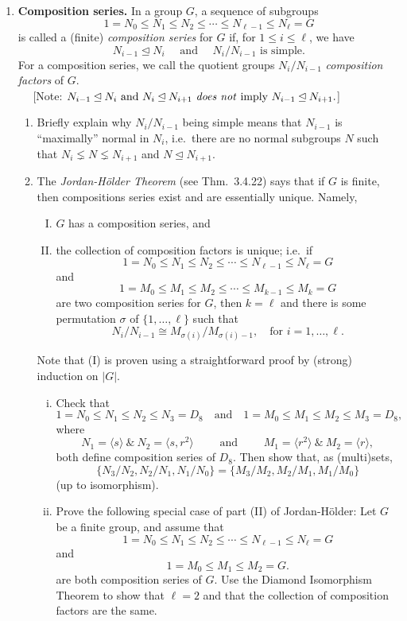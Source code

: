 \documentclass[11pt, reqno]{amsart}
\theoremstyle{plain}
\theoremstyle{definition}
\theoremstyle{example}
\def\<{\langle} \def\>{\rangle}
\def\normeq{\unlhd}
\begin{document}
\begin{enumerate}[1.]
\item {\bf Composition series.} In a group $G$, a sequence of subgroups 
$$1 = N_0 \leq N_1 \leq N_2 \leq \cdots \leq N_{\ell-1} \leq N_\ell = G$$
is called a (finite) \emph{composition series} for $G$ if, for $1 \leq i \leq \ell$, we have
$$N_{i-1} \normeq N_{i} \quad \text{ and } \quad N_{i}/N_{i-1} \text{ is simple.}$$
 For a composition series, we call the quotient groups $N_{i}/N_{i-1}$  \emph{composition factors} of $G$.\\$\quad$ \hfill{\footnotesize[Note:  
$N_{i-1} \normeq N_{i} \text{ and } N_i \normeq N_{i+1} \text{ \emph{does not} imply } N_{i-1} \normeq N_{i+1}.$]}
\begin{enumerate}
\item Briefly explain why $N_{i}/N_{i-1}$ being simple means that $N_{i-1}$ is ``maximally'' normal in $N_{i}$, i.e.\  there are no normal subgroups $N$ such that $N_{i} \lneq N \lneq N_{i+1}$ and $N \normeq N_{i+1}$. 
\item The \emph{Jordan-H\"{o}lder Theorem} (see Thm.\ 3.4.22) says that if $G$ is finite, then compositions series exist and are essentially unique. Namely,
\begin{enumerate}[(I)]
\item $G$ has a composition series, and 
\item the collection of composition factors is unique; i.e.\ if 
$$1 = N_0 \leq N_1 \leq N_2 \leq \cdots \leq N_{\ell-1} \leq N_\ell = G$$
and 
$$1 = M_0 \leq M_1 \leq M_2 \leq \cdots \leq M_{k-1} \leq M_k = G$$
are two composition series for $G$, then $k = \ell$ and there is some permutation $\sigma$ of $\{1, \dots, \ell\}$ such that 
$$N_i/ N_{i-1} \cong M_{\sigma(i)}/ M_{\sigma(i) - 1}, \quad \text{for } i = 1, \dots, \ell.$$
\end{enumerate}
Note that (I) is proven using a straightforward proof by (strong) induction on $|G|$. 
\begin{enumerate}[(i)]
\item Check that
$$1 = N_0 \leq N_1 \leq N_2 \leq N_3 = D_8 \quad \text{and} \quad 
	1 = M_0 \leq M_1 \leq M_2 \leq M_3 = D_8,$$
where 
$$N_1 = \<s\> \ \&\ N_2 = \<s, r^2\> \qquad \text{ and } \qquad M_1 = \<r^2\>  \ \&\ M_2 = \<r\>,$$
both define composition series of $D_8$. Then show that, as (multi)sets, 
$$\{N_3/N_2, N_2/N_1, N_1/N_0\} = \{M_3/M_2, M_2/M_1, M_1/M_0\}$$ 
(up to isomorphism). 
\item Prove the following special case of part (II) of Jordan-H\"{o}lder: Let $G$ be a finite group, and assume that 
\begin{equation}\tag{$*$}\label{comp-series-1}
1 = N_0 \leq N_1 \leq N_2 \leq \cdots \leq N_{\ell-1} \leq N_\ell = G
\end{equation}
and 
\begin{equation}\tag{$**$}\label{comp-series-2}
1 = M_0 \leq M_1 \leq M_2 = G.
\end{equation}
are both composition series of $G$. Use the Diamond Isomorphism Theorem to show that $\ell = 2$ and that the collection of composition factors are the same.


\end{enumerate}
\end{enumerate}
\end{enumerate}
\end{document}
